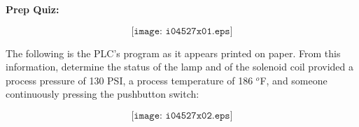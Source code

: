 \documentclass[12pt,a4paper]{article}
\begin{document}
\vfil \eject

\noindent
{\bf Prep Quiz:}

$$\texttt{[image: i04527x01.eps]}$$

The following is the PLC's program as it appears printed on paper.  From this information, determine the status of the lamp and of the solenoid coil provided a process pressure of 130 PSI, a process temperature of 186 $^{o}$F, and someone continuously pressing the pushbutton switch:

$$\texttt{[image: i04527x02.eps]}$$



\vfil \eject 
\end{document}
